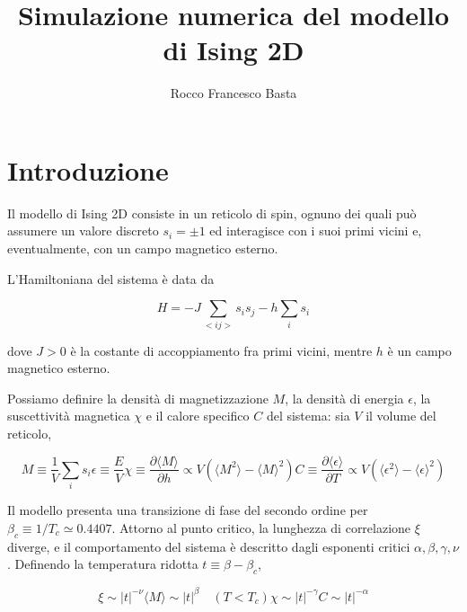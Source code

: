 \documentclass[10pt, a4paper, twocolumn]{article}
\title{Simulazione numerica del modello di Ising 2D}
\author{Rocco Francesco Basta}
\newcommand{\avg}[1]{\langle{#1}\rangle}
\begin{document}
	\maketitle
	\section{Introduzione}
		Il modello di Ising 2D consiste in un reticolo di spin, ognuno dei quali può assumere un valore discreto $s_i = \pm 1$ ed interagisce con i suoi primi vicini e, eventualmente, con un campo magnetico esterno.

		L'Hamiltoniana del sistema è data da

		\begin{equation}
			H = -J\sum_{<ij>} s_i s_j - h \sum_i s_i
		\end{equation}

		dove $J > 0$ è la costante di accoppiamento fra primi vicini, mentre $h$ è un campo magnetico esterno.

		Possiamo definire la densità di magnetizzazione $M$, la densità di
		energia $\epsilon$, la suscettività magnetica $\chi$ e il calore
		specifico $C$ del sistema: sia $V$ il volume del reticolo,

		\begin{subequations}
		\begin{equation}
			M \equiv \frac{1}{V} \sum_i s_i
		\end{equation}
		\begin{equation}
			\epsilon \equiv \frac{E}{V}
		\end{equation}
		\begin{equation}
			\chi \equiv \frac{\partial \avg{M}}{\partial h} \propto V ( \avg{M^2} - \avg{M}^2)
		\end{equation}
		\begin{equation}
			C \equiv \frac{\partial \avg{\epsilon}}{\partial T} \propto V (\avg{\epsilon^2} - \avg{\epsilon}^2)
		\end{equation}

		\end{subequations}

		Il modello presenta una transizione di fase del secondo ordine per
		$\beta_c \equiv 1/T_{c} \simeq 0.4407$. Attorno al punto critico, la lunghezza di
		correlazione $\xi$ diverge, e il comportamento del sistema è descritto
		dagli esponenti critici $\alpha, \beta, \gamma, \nu$. Definendo la temperatura ridotta $t \equiv \beta - \beta_c$,

		\begin{subequations}
		\begin{equation}
			\xi \sim |t|^{-\nu} 
		\end{equation}
		\begin{equation}
			\avg{M} \sim |t|^\beta \quad (T < T_c) 
		\end{equation}
		\begin{equation}
			\chi \sim |t|^{-\gamma}
		\end{equation}
		\begin{equation}
			C \sim |t|^{-\alpha}
		\end{equation}
		\end{subequations}
\end{document}
